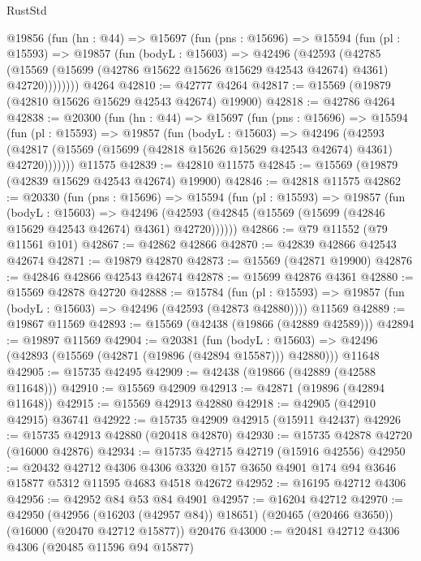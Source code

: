 \begin{lexlean}{RustStd}
\begin{coremodule}
    @19856
      (fun (hn : @44) =>
      @15697
        (fun (pns : @15696) =>
        @15594
          (fun (pl : @15593) =>
          @19857
            (fun (bodyL : @15603) =>
            @42496
              (@42593
                (@42785
                  (@15569 (@15699 (@42786 @15622 @15626 @15629 @42543 @42674) @4361) @42720))))))))
    @4264
@42810 := @42777 @4264
@42817 := @15569 (@19879 (@42810 @15626 @15629 @42543 @42674) @19900)
@42818 := @42786 @4264
@42838 := @20300
    (fun (hn : @44) =>
    @15697
      (fun (pns : @15696) =>
      @15594
        (fun (pl : @15593) =>
        @19857
          (fun (bodyL : @15603) =>
          @42496
            (@42593
              (@42817 (@15569 (@15699 (@42818 @15626 @15629 @42543 @42674) @4361) @42720)))))))
    @11575
@42839 := @42810 @11575
@42845 := @15569 (@19879 (@42839 @15629 @42543 @42674) @19900)
@42846 := @42818 @11575
@42862 := @20330
    (fun (pns : @15696) =>
    @15594
      (fun (pl : @15593) =>
      @19857
        (fun (bodyL : @15603) =>
        @42496 (@42593 (@42845 (@15569 (@15699 (@42846 @15629 @42543 @42674) @4361) @42720))))))
@42866 := @79 @11552 (@79 @11561 @101)
@42867 := @42862 @42866
@42870 := @42839 @42866 @42543 @42674
@42871 := @19879 @42870
@42873 := @15569 (@42871 @19900)
@42876 := @42846 @42866 @42543 @42674
@42878 := @15699 @42876 @4361
@42880 := @15569 @42878 @42720
@42888 := @15784
    (fun (pl : @15593) => @19857 (fun (bodyL : @15603) => @42496 (@42593 (@42873 @42880))))
    @11569
@42889 := @19867 @11569
@42893 := @15569 (@42438 (@19866 (@42889 @42589)))
@42894 := @19897 @11569
@42904 := @20381
    (fun (bodyL : @15603) => @42496 (@42893 (@15569 (@42871 (@19896 (@42894 @15587))) @42880)))
    @11648
@42905 := @15735 @42495
@42909 := @42438 (@19866 (@42889 (@42588 @11648)))
@42910 := @15569 @42909
@42913 := @42871 (@19896 (@42894 @11648))
@42915 := @15569 @42913 @42880
@42918 := @42905 (@42910 @42915) @36741
@42922 := @15735 @42909 @42915 (@15911 @42437)
@42926 := @15735 @42913 @42880 (@20418 @42870)
@42930 := @15735 @42878 @42720 (@16000 @42876)
@42934 := @15735 @42715 @42719 (@15916 @42556)
@42950 := @20432
    @42712
    @4306
    @4306
    @3320
    @157
    @3650
    @4901
    @174
    @94
    @3646
    @15877
    @5312
    @11595
    @4683
    @4518
    @42672
@42952 := @16195 @42712 @4306
@42956 := @42952 @84 @53 @84 @4901
@42957 := @16204 @42712
@42970 := @42950
    (@42956 (@16203 (@42957 @84)) @18651)
    (@20465 (@20466 @3650))
    (@16000 (@20470 @42712 @15877))
    @20476
@43000 := @20481
    @42712
    @4306
    @4306
    (@20485 @11596 @94 @15877)

\end{coremodule}
\end{lexlean}
